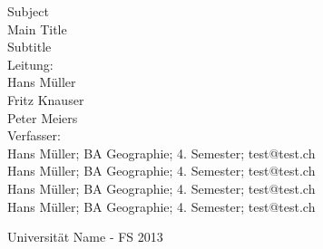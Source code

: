 \begin{titlepage}
	\sffamily
	\centering
{\Large Subject}\\
\vfill
{\Huge Main Title}\\[2ex]
{\Huge Subtitle}\\
\vfill
Leitung:\\[1ex]
{\Large Hans Müller}\\
{\Large Fritz Knauser}\\
{\Large Peter Meiers}\\
\vfill
Verfasser:\\[1ex]
Hans Müller; BA Geographie; 4. Semester; test@test.ch\\
Hans Müller; BA Geographie; 4. Semester; test@test.ch\\
Hans Müller; BA Geographie; 4. Semester; test@test.ch\\
Hans Müller; BA Geographie; 4. Semester; test@test.ch\\
\vfill
\raggedright
\small
Universität Name - FS 2013\\[2cm]
\end{titlepage}
